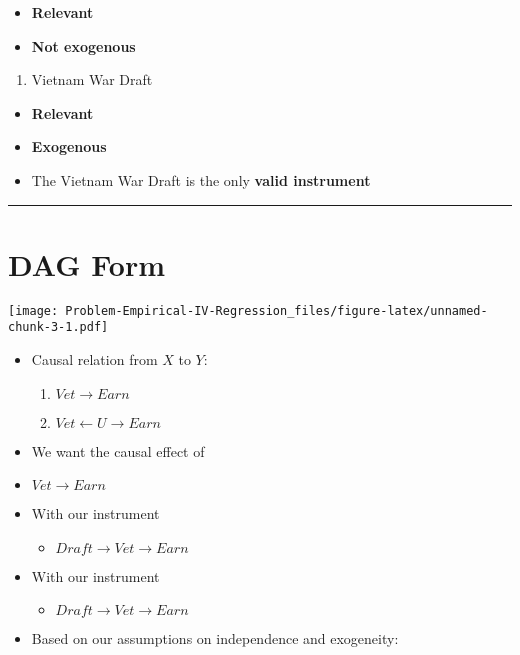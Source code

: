 \documentclass[
]{article}
\providecommand{\tightlist}{%
  \setlength{\itemsep}{0pt}\setlength{\parskip}{0pt}}
\begin{document}
\begin{itemize}
\tightlist
\item
  \textbf{Relevant}
\item
  \textbf{Not exogenous}
\end{itemize}

\begin{enumerate}
\def\labelenumi{\arabic{enumi}.}
\setcounter{enumi}{2}
\tightlist
\item
  Vietnam War Draft
\end{enumerate}

\begin{itemize}
\item
  \textbf{Relevant}
\item
  \textbf{Exogenous}
\item
  The Vietnam War Draft is the only \textbf{valid instrument}
\end{itemize}

\begin{center}\rule{0.5\linewidth}{0.5pt}\end{center}

\hypertarget{dag-form}{%
\section{DAG Form}\label{dag-form}}

\texttt{[image: Problem-Empirical-IV-Regression\_files/figure-latex/unnamed-chunk-3-1.pdf]}

\begin{itemize}
\item
  Causal relation from \(X\) to \(Y\):

  \begin{enumerate}
  \def\labelenumi{\arabic{enumi}.}
  \tightlist
  \item
    \(Vet \rightarrow Earn\)
  \item
    \(Vet \leftarrow U \rightarrow Earn\)
  \end{enumerate}
\item
  We want the causal effect of
\item
  \(Vet \rightarrow Earn\)
\item
  With our instrument

  \begin{itemize}
  \tightlist
  \item
    \(Draft \rightarrow Vet \rightarrow Earn\)
  \end{itemize}
\item
  With our instrument

  \begin{itemize}
  \tightlist
  \item
    \(Draft \rightarrow Vet \rightarrow Earn\)
  \end{itemize}
\item
  Based on our assumptions on independence and exogeneity:
\end{itemize}
\end{document}
